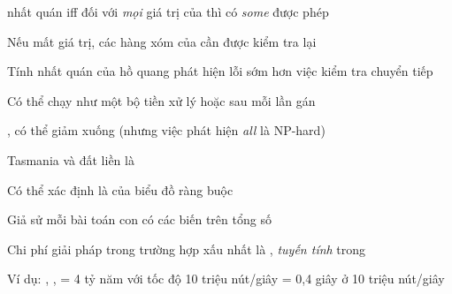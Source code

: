 \documentclass{article}
\begin{document}
\begin{huge}
 nhất quán iff\al
  đối với \emph{mọi} giá trị  của  thì có \emph{some} được phép 

\vspace*{0.1in}

\maxfigwidth
{}

Nếu  mất giá trị, các hàng xóm của  cần được kiểm tra lại

Tính nhất quán của hồ quang phát hiện lỗi sớm hơn việc kiểm tra chuyển tiếp

Có thể chạy như một bộ tiền xử lý hoặc sau mỗi lần gán







, có thể giảm xuống 
(nhưng việc phát hiện \emph{all} là NP-hard)


\vspace*{-0.4in}

\textwidth
{}

Tasmania và đất liền là 

Có thể xác định là  của biểu đồ ràng buộc


Giả sử mỗi bài toán con có các biến  trên tổng số 

Chi phí giải pháp trong trường hợp xấu nhất là , \emph{tuyến tính} trong 

Ví dụ: , , \al
   = 4 tỷ năm với tốc độ 10 triệu nút/giây\al
   = 0,4 giây ở 10 triệu nút/giây



\vspace*{0.3in}

\textwidth
{}


\end{huge}
\end{document}
